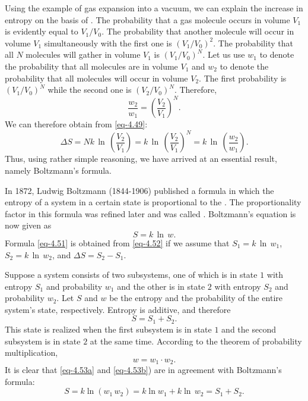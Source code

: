 Using the example of gas expansion into a vacuum, we can explain the increase in entropy on the basis of . The probability that a gas molecule occurs in volume $V_{1}$ is evidently equal to $V_{1} / V_{0}$. The probability that another molecule will occur in volume $V_{1}$ simultaneously with the first one is $(V_{1} / V_{0})^{2}$. The probability that all $N$ molecules
will gather in volume $V_{1}$ is $(V_{1} / V_{0})^{N}$. Let us use $w_{1}$ to denote the probability that all molecules are in volume $V_{1}$ and $w_{2}$ to denote the probability that all molecules will occur in volume $V_{2}$. The first probability is $(V_{1} / V_{0})^{N}$ while the second one is $(V_{2} / V_{0})^{N}$. Therefore,
\begin{equation}%
\frac{w_{2}}{w_{1}} =	 \left( \frac{V_{2}}{V_{1}} \right)^{N}.
\label{eq-4.50}
\end{equation}
We can therefore obtain from \eqref{eq-4.49}:
\begin{equation}%
\Delta S =	N k \, \ln \, \left( \frac{V_{2}}{V_{1}} \right) = k \, \ln \, \left( \frac{V_{2}}{V_{1}} \right)^{N} = k \, \ln \, \left( \frac{w_{2}}{w_{1}} \right).
\label{eq-4.51}
\end{equation}
Thus, using rather simple reasoning, we have arrived at an essential result, namely Boltzmann's formula.

 In 1872, Ludwig Boltzmann (1844-1906) published a formula in which the entropy of a system in a certain state is proportional to the . The proportionality factor in this formula was refined later and was called . Boltzmann's equation is now given as
\begin{equation}%
S= k \, \ln \, w.
\label{eq-4.52}
\end{equation}
Formula \eqref{eq-4.51} is obtained from \eqref{eq-4.52} if we assume that $S_{1}= k \, \ln \, w_{1}$, $S_{2}= k \, \ln \, w_{2}$, and $\Delta S = S_{2} - S_{1}$.

Suppose a system consists of two subsystems, one of which is in state
$\mathit{1}$ with entropy $S_{1}$ and probability $w_{1}$ and the other is in state $\mathit{2}$ with entropy $S_{2}$ and probability $w_{2}$.	Let	$S$ and $w$ be the entropy and	the probability of the entire system's state, respectively. Entropy is additive, and therefore
\begin{equation}%
 S= S_{1} + S_{2}.
\label{eq-4.53a}
\tag{4.53a}
\end{equation}
This state is realized when the first subsystem is in state $\mathit{1}$ and the second subsystem is in state $\mathit{2}$ at the same time. According to the theorem of probability multiplication,
\begin{equation}%
w = w_{1} \cdot w_{2}.
\label{eq-4.53b}
\tag{4.53b}
\end{equation}
It is clear that \eqref{eq-4.53a} and \eqref{eq-4.53b}) are in agreement with Boltzmann's formula:
\begin{equation*}%
S= k \ln ( w_{1} \, w_{2}) = k \ln  w_{1}  +k \ln \, w_{2} = S_{1} + S_{2}.
\end{equation*}

